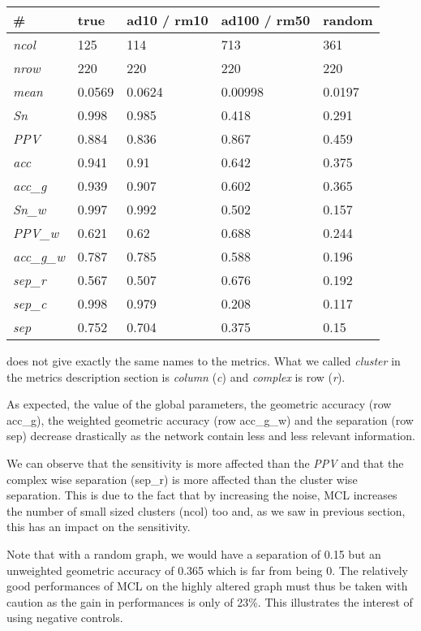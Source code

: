 \begin{tabular}{|l|l|l|l|l|}
\hline
\# & \textbf{true }& \textbf{ad10 / rm10} & \textbf{ad100 / rm50} & \textbf{random} \\ \hline
\textit{ncol} & 125 & 114 & 713 & 361 \\ \hline
\textit{nrow} & 220 & 220 & 220 & 220 \\ \hline
\textit{mean} & 0.0569 & 0.0624 & 0.00998 & 0.0197 \\ \hline
\textit{Sn} & 0.998 & 0.985 & 0.418 & 0.291 \\ \hline
\textit{PPV} & 0.884 & 0.836 & 0.867 & 0.459 \\ \hline
\textit{acc} & 0.941 & 0.91 & 0.642 & 0.375 \\ \hline
\textit{acc\_g} & 0.939 & 0.907 & 0.602 & 0.365 \\ \hline
\textit{Sn\_w} & 0.997 & 0.992 & 0.502 & 0.157 \\ \hline
\textit{PPV\_w} & 0.621 & 0.62 & 0.688 & 0.244 \\ \hline
\textit{acc\_g\_w} & 0.787 & 0.785 & 0.588 & 0.196 \\ \hline
\textit{sep\_r} & 0.567 & 0.507 & 0.676 & 0.192 \\ \hline
\textit{sep\_c} & 0.998 & 0.979 & 0.208 & 0.117 \\ \hline
\textit{sep} & 0.752 & 0.704 & 0.375 & 0.15 \\ \hline
\end{tabular}


 does not give exactly the same names to the metrics. What we called \textit{cluster} in the metrics description section is \textit{column} (\textit{c}) and \textit{complex} is row (\textit{r}).

As expected, the value of the global parameters, the geometric accuracy (row acc\_g), the weighted geometric accuracy (row acc\_g\_w) and the separation (row sep) decrease drastically as the network contain less and less relevant information.

We can observe that the sensitivity is more affected than the \textit{PPV} and that the complex wise separation (sep\_r) is more affected than the cluster wise separation. This is due to the fact that by increasing the noise, MCL increases the number of small sized clusters (ncol) too and, as we saw in previous section, this has an impact on the sensitivity.

Note that with a random graph, we would have a separation of 0.15 but an unweighted geometric accuracy of 0.365 which is far from being 0. The relatively good performances of MCL on the highly altered graph must thus be taken with caution as the gain in performances is only of 23\%. This illustrates the interest of using negative controls.
